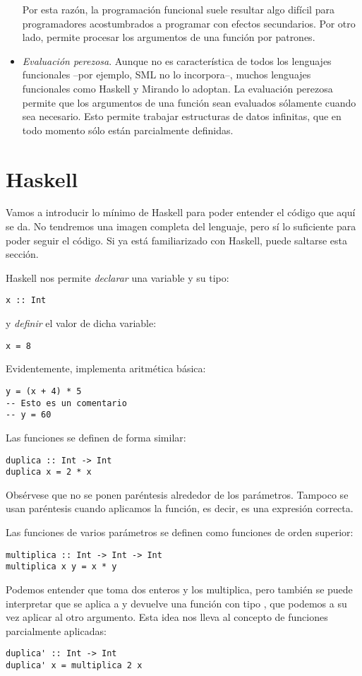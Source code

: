 \begin{itemize}
  Por esta razón, la programación funcional suele resultar algo difícil para programadores acostumbrados a programar con efectos secundarios.
  Por otro lado, permite procesar los argumentos de una función por patrones.

  \item \emph{Evaluación perezosa}. Aunque no es característica de todos los lenguajes funcionales --por ejemplo, SML no lo incorpora--, muchos lenguajes funcionales como Haskell y Mirando lo adoptan.
  La evaluación perezosa permite que los argumentos de una función sean evaluados sólamente cuando sea necesario.
  Esto permite trabajar estructuras de datos infinitas, que en todo momento sólo están parcialmente definidas.
\end{itemize}

\section{Haskell}
Vamos a introducir lo mínimo de Haskell para poder entender el código que aquí se da.
No tendremos una imagen completa del lenguaje, pero sí lo suficiente para poder seguir el código.
Si ya está familiarizado con Haskell, puede saltarse esta sección.

Haskell nos permite \emph{declarar} una variable y su tipo:
\begin{verbatim}
x :: Int
\end{verbatim}
y \emph{definir} el valor de dicha variable:
\begin{verbatim}
x = 8
\end{verbatim}
Evidentemente, implementa aritmética básica:
\begin{verbatim}
y = (x + 4) * 5
-- Esto es un comentario
-- y = 60
\end{verbatim}
Las funciones se definen de forma similar:
\begin{verbatim}
duplica :: Int -> Int
duplica x = 2 * x
\end{verbatim}
Obsérvese que no se ponen paréntesis alrededor de los parámetros.
Tampoco se usan paréntesis cuando aplicamos la función, es decir,  es una expresión correcta.

Las funciones de varios parámetros se definen como funciones de orden superior:
\begin{verbatim}
multiplica :: Int -> Int -> Int
multiplica x y = x * y
\end{verbatim}
Podemos entender que  toma dos enteros y los multiplica, pero también se puede interpretar que  se aplica a  y devuelve una función con tipo , que podemos a su vez aplicar al otro argumento.
Esta idea nos lleva al concepto de funciones parcialmente aplicadas:
\begin{verbatim}
duplica' :: Int -> Int
duplica' x = multiplica 2 x
\end{verbatim}


